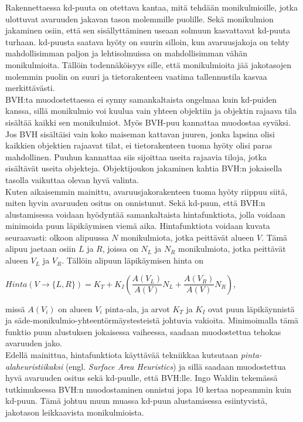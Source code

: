 \documentclass[a4paper, 12pt, titlepage]{article}
\begin{document}
Rakennettaessa kd-puuta on otettava kantaa, mitä tehdään monikulmioille, jotka ulottuvat avaruuden jakavan tason molemmille puolille. Sekä monikulmion jakaminen osiin, että sen sisällyttäminen useaan solmuun kasvattavat kd-puuta turhaan. kd-puusta saatava hyöty on suurin silloin, kun avaruusjakoja on tehty mahdollisimman paljon ja lehtisolmuissa on mahdollisimman vähän monikulmioita. Tällöin todennäköisyys sille, että monikulmioita jää jakotasojen molemmin puolin on suuri ja tietorakenteen vaatima tallennustila kasvaa merkittävästi. \citep[.]{wald04} \\

BVH:ta muodostettaessa ei synny samankaltaista ongelmaa kuin kd-puiden kanssa, sillä monikulmio voi kuulua vain yhteen objektiin ja objektin rajaava tila sisältää kaikki sen monikulmiot. Myös BVH-puu kannattaa muodostaa syväksi. Jos BVH sisältäisi vain koko maiseman kattavan juuren, jonka lapsina olisi kaikkien objektien rajaavat tilat, ei tietorakenteen tuoma hyöty olisi paras mahdollinen. Puuhun kannattaa siis sijoittaa useita rajaavia tiloja, jotka sisältävät useita objekteja. Objektijoukon jakaminen kahtia BVH:n jokaisella tasolla vaikuttaa olevan hyvä valinta. \citep[.]{goldsmith} \\

Kuten aikaisemmin mainittu, avaruusjakorakenteen tuoma hyöty riippuu siitä, miten hyvin avaruuden ositus on onnistunut. Sekä kd-puun, että BVH:n alustamisessa voidaan hyödyntää samankaltaista hintafunktiota, jolla voidaan minimoida puun läpikäymisen viemä aika. Hintafunktiota voidaan kuvata seuraavasti: olkoon alipuussa $N$ monikulmiota, jotka peittävät alueen $V$. Tämä alipuu jaetaan osiin $L$ ja $R$, joissa on $N_L$ ja $N_R$ monikulmiota, jotka peittävät alueen $V_L$ ja $V_R$. Tällöin alipuun läpikäymisen hinta on\\

\begin{centering} 
$Hinta(V\to\{L,R\}) = K_T + K_I \left(\dfrac{A(V_L)}{A(V)}N_L + \dfrac{A(V_R)}{A(V)}N_R \right)$,\\
\vspace{0.2cm}
\end{centering}
missä $A(V_i)$ on alueen $V_i$ pinta-ala, ja arvot $K_T$ ja $K_I$ ovat puun läpikäynnistä ja säde-monikulmio-yhteentörmäystesteistä johtuvia vakioita. Minimoimalla tämä funktio puun alustuksen jokaisessa vaiheessa, saadaan muodostettua tehokas avaruuden jako. \citep[.]{wald07}\\

Edellä mainittua, hintafunktiota käyttävää tekniikkaa kutsutaan \emph{pinta-alaheuristiikaksi} (engl. \emph{Surface Area Heuristics}) ja sillä saadaan muodostettua hyvä avaruuden ositus sekä kd-puulle, että BVH:lle. Ingo Waldin tekemässä tutkimuksessa BVH:n muodostaminen onnistui jopa 10 kertaa nopeammin kuin kd-puun. Tämä johtuu muun muassa kd-puun alustamisessa esiintyvistä, jakotason leikkaavista monikulmioista. \citep[.]{wald07}  
\end{document}
